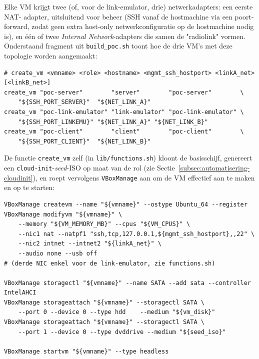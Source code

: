 Elke VM krijgt twee (of, voor de link-emulator, drie) netwerkadapters: een eerste NAT-
adapter, uitsluitend voor beheer (SSH vanaf de hostmachine via een poort-forward, zodat
geen extra host-only netwerkconfiguratie op de hostmachine nodig is), en één of twee
\textit{Internal Network}-adapters die samen de "radiolink" vormen. Onderstaand
fragment uit \texttt{build\_poc.sh} toont hoe de drie VM's met deze topologie worden
aangemaakt:

\begin{listing}[h]
\begin{verbatim}
# create_vm <vmname> <role> <hostname> <mgmt_ssh_hostport> <linkA_net> [<linkB_net>]
create_vm "poc-server"        "server"        "poc-server"        \
    "${SSH_PORT_SERVER}"  "${NET_LINK_A}"
create_vm "poc-link-emulator" "link-emulator" "poc-link-emulator" \
    "${SSH_PORT_LINKEMU}" "${NET_LINK_A}" "${NET_LINK_B}"
create_vm "poc-client"        "client"        "poc-client"        \
    "${SSH_PORT_CLIENT}"  "${NET_LINK_B}"
\end{verbatim}
\caption[Aanmaak van de drie PoC-VM's]{Aanroep van de \texttt{create\_vm}-functie voor
elk van de drie rollen, met hun respectievelijke netwerktopologie.}
\label{lst:create-vm-calls}
\end{listing}

De functie \texttt{create\_vm} zelf (in \texttt{lib/functions.sh}) kloont de
basisschijf, genereert een \texttt{cloud-init}-\textit{seed}-ISO op maat van de rol
(zie Sectie~\ref{subsec:automatisering-cloudinit}), en roept vervolgens
\texttt{VBoxManage} aan om de VM effectief aan te maken en op te starten:

\begin{listing}[h]
\begin{verbatim}
VBoxManage createvm --name "${vmname}" --ostype Ubuntu_64 --register
VBoxManage modifyvm "${vmname}" \
    --memory "${VM_MEMORY_MB}" --cpus "${VM_CPUS}" \
    --nic1 nat --natpf1 "ssh,tcp,127.0.0.1,${mgmt_ssh_hostport},,22" \
    --nic2 intnet --intnet2 "${linkA_net}" \
    --audio none --usb off
# (derde NIC enkel voor de link-emulator, zie functions.sh)

VBoxManage storagectl "${vmname}" --name SATA --add sata --controller IntelAHCI
VBoxManage storageattach "${vmname}" --storagectl SATA \
    --port 0 --device 0 --type hdd    --medium "${vm_disk}"
VBoxManage storageattach "${vmname}" --storagectl SATA \
    --port 1 --device 0 --type dvddrive --medium "${seed_iso}"

VBoxManage startvm "${vmname}" --type headless
\end{verbatim}
\caption[VBoxManage-aanroepen voor VM-aanmaak]{Kern van de \texttt{create\_vm}-functie:
VM-definitie, netwerkadapters, opslag (schijf + cloud-init-ISO) en opstart.}
\label{lst:vboxmanage-create}
\end{listing}


